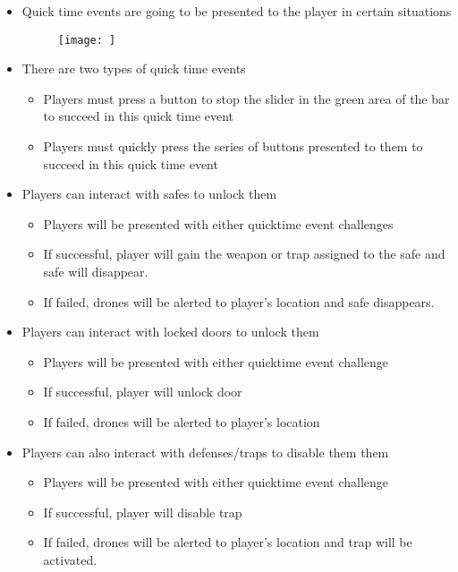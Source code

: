 \documentclass[10pt]{report}
\begin{document}
\begin{itemize}
    \item Quick time events are going to be presented to the player in certain situations
    \begin{figure}
        \texttt{[image: ]}
    \end{figure}
    \item There are two types of quick time events
    \begin{itemize}
        \item Players must press a button to stop the slider in the green area of the bar to  succeed in this quick time event 
        \item Players must quickly press the series of buttons presented to them to succeed in this quick time event
    \end{itemize}
    \item Players can interact with safes to unlock them
    \begin{itemize}
        \item Players will be presented with either quicktime event challenges
        \item If successful, player will gain the weapon or trap assigned to the safe and safe will disappear.
        \item If failed, drones will be alerted to player’s location and safe disappears.
    \end{itemize}
    \item Players can interact with locked doors to unlock them
    \begin{itemize}
        \item Players will be presented with either quicktime event challenge
        \item If successful, player will unlock door 
        \item If failed, drones will be alerted to player’s location
    \end{itemize}
    \item Players can also interact with defenses/traps to disable them them
    \begin{itemize}
        \item Players will be presented with either quicktime event challenge
        \item If successful, player will disable trap 
        \item If failed, drones will be alerted to player’s location and trap will be activated.
    \end{itemize}
\end{itemize}
\end{document}

